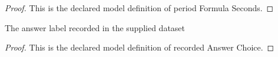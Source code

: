 \begin{proof}
  This is the declared model definition of period Formula Seconds.
\end{proof}
\begin{definition}
  \label{def:physics:phyx-mini-0807:phyxminiproblems-problemphyxmini0807-recordedanswerchoice}
  The answer label recorded in the supplied dataset
\end{definition}
\begin{proof}
  This is the declared model definition of recorded Answer Choice.
\end{proof}
